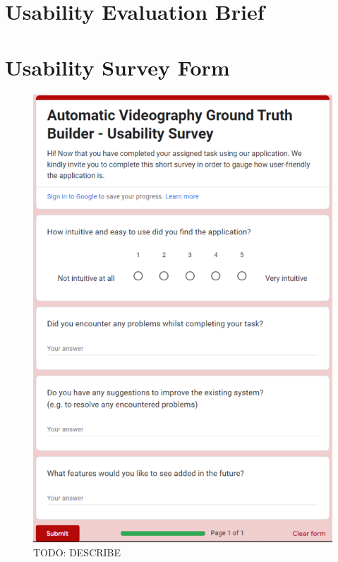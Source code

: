 \documentclass{l4proj}
\begin{document}
\begin{appendices}
\chapter{Usability Evaluation Brief}
\label{app:usability_eval_brief}



\chapter{Usability Survey Form}
\label{app:usability_survey}
\begin{figure}
    \centering
    \includegraphics[width=1\textwidth]{figures/usability_survey.pdf}
    \caption{TODO: DESCRIBE}
    \label{fig:usability_survey}
\end{figure}

\end{appendices}




\renewcommand{\thechapter}{0} 

\end{document}
